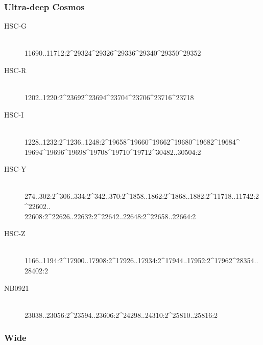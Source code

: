 \documentclass[DM,lsstdraft,STS,toc]{lsstdoc}
\begin{document}
\subsubsection{Ultra-deep Cosmos}
\label{sec:hscrc1}

\begin{description}

\item[HSC-G]{\hfill \\ 11690..11712:2\^{}29324\^{}29326\^{}29336\^{}29340\^{}29350\^{}29352}
\item[HSC-R]{\hfill \\ 1202..1220:2\^{}23692\^{}23694\^{}23704\^{}23706\^{}23716\^{}23718}
\item[HSC-I]{\hfill \\ 1228..1232:2\^{}1236..1248:2\^{}19658\^{}19660\^{}19662\^{}19680\^{}19682\^{}19684\^{}\\19694\^{}19696\^{}19698\^{}19708\^{}19710\^{}19712\^{}30482..30504:2}
\item[HSC-Y]{\hfill \\ 274..302:2\^{}306..334:2\^{}342..370:2\^{}1858..1862:2\^{}1868..1882:2\^{}11718..11742:2\^{}22602..\\22608:2\^{}22626..22632:2\^{}22642..22648:2\^{}22658..22664:2}
\item[HSC-Z]{\hfill \\ 1166..1194:2\^{}17900..17908:2\^{}17926..17934:2\^{}17944..17952:2\^{}17962\^{}28354..28402:2}
\item[NB0921]{\hfill \\ 23038..23056:2\^{}23594..23606:2\^{}24298..24310:2\^{}25810..25816:2}

\end{description}

\subsubsection{Wide}
\end{document}

